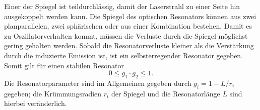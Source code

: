 Einer der Spiegel ist teildurchlässig, damit der Laserstrahl zu einer Seite hin ausgekoppelt werden kann.
Die Spiegel des optischen Resonators können aus zwei planparallelen, zwei sphärischen oder aus einer Kombination bestehen.
Damit es zu Oszillatorverhalten kommt, müssen die Verluste durch die Spiegel möglichst gering gehalten werden.
Sobald die Resonatorverluste kleiner als die Verstärkung durch die induzierte Emission ist, ist ein selbsterregender Resonator gegeben.
Somit gilt für einen stabilen Resonator
\begin{equation}
  0 \leq g_1 \cdot g_2 \leq 1.
\end{equation}
Die Resonatorparameter sind im Allgemeinen gegeben durch $g_i=1-L/r_i$ gegeben;
die Krümmungsradien $r_i$ der Spiegel und die Resonatorlänge $L$ sind hierbei veränderlich.
